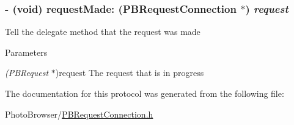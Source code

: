 \hypertarget{protocol_p_b_request_data_delegate-p_a611a767feb6d909f711af3edbfbcac71}{
\subsubsection[{requestMade:}]{\setlength{\rightskip}{0pt plus 5cm}-\/ (void) requestMade: ({\bf PBRequestConnection} $\ast$) {\em request}}}
\label{protocol_p_b_request_data_delegate-p_a611a767feb6d909f711af3edbfbcac71}
Tell the delegate method that the request was made 
\begin{DoxyParams}{Parameters}
\item[{\em (PBRequest}]$\ast$)request The request that is in progress \end{DoxyParams}


The documentation for this protocol was generated from the following file:\begin{DoxyCompactItemize}
\item 
PhotoBrowser/\hyperlink{_p_b_request_connection_8h}{PBRequestConnection.h}\end{DoxyCompactItemize}
